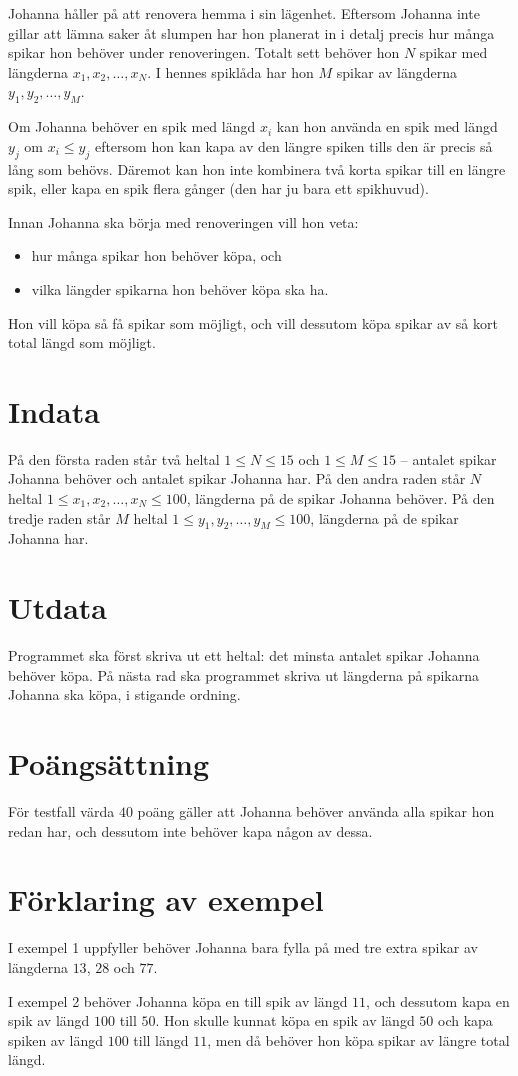 Johanna håller på att renovera hemma i sin lägenhet.
Eftersom Johanna inte gillar att lämna saker åt slumpen har hon planerat in i detalj precis hur många spikar hon behöver under renoveringen.
Totalt sett behöver hon $N$ spikar med längderna $x_1, x_2, \dots, x_N$.
I hennes spiklåda har hon $M$ spikar av längderna $y_1, y_2, \dots, y_M$.

Om Johanna behöver en spik med längd $x_i$ kan hon använda en spik med längd $y_j$ om $x_i \le y_j$ eftersom hon kan kapa av den längre spiken tills den är precis så lång som behövs.
Däremot kan hon inte kombinera två korta spikar till en längre spik, eller kapa en spik flera gånger (den har ju bara ett spikhuvud).

Innan Johanna ska börja med renoveringen vill hon veta:
\begin{itemize}
    \item hur många spikar hon behöver köpa, och
    \item vilka längder spikarna hon behöver köpa ska ha.
\end{itemize}

Hon vill köpa så få spikar som möjligt, och vill dessutom köpa spikar av så kort total längd som möjligt.

\section*{Indata}
På den första raden står två heltal $1 \le N \le 15$ och $1 \le M \le 15$ -- antalet spikar Johanna behöver och antalet spikar Johanna har.
På den andra raden står $N$ heltal $1 \le x_1, x_2, \dots, x_N \le 100$, längderna på de spikar Johanna behöver.
På den tredje raden står $M$ heltal $1 \le y_1, y_2, \dots, y_M \le 100$, längderna på de spikar Johanna har.

\section*{Utdata}
Programmet ska först skriva ut ett heltal: det minsta antalet spikar Johanna behöver köpa.
På nästa rad ska programmet skriva ut längderna på spikarna Johanna ska köpa, i stigande ordning.

\section*{Poängsättning}
För testfall värda $40$ poäng gäller att Johanna behöver använda alla spikar hon redan har, och dessutom inte behöver kapa någon av dessa.

\section*{Förklaring av exempel}
I exempel 1 uppfyller behöver Johanna bara fylla på med tre extra spikar av längderna $13$, $28$ och $77$.

I exempel 2 behöver Johanna köpa en till spik av längd $11$, och dessutom kapa en spik av längd $100$ till $50$.
Hon skulle kunnat köpa en spik av längd $50$ och kapa spiken av längd $100$ till längd $11$, men då behöver hon köpa spikar av längre total längd.
